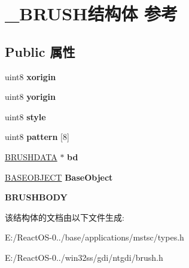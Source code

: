 \hypertarget{struct___b_r_u_s_h}{}\section{\+\_\+\+B\+R\+U\+S\+H结构体 参考}
\label{struct___b_r_u_s_h}
\subsection*{Public 属性}
\begin{DoxyCompactItemize}
\item 
\mbox{\label{struct___b_r_u_s_h_a29a28fcac88f1c9c8093e3fcf7a2870e}} 
uint8 {\bfseries xorigin}
\item 
\mbox{\label{struct___b_r_u_s_h_aa1ecd386bbd7ec30848c1099793a66e0}} 
uint8 {\bfseries yorigin}
\item 
\mbox{\label{struct___b_r_u_s_h_af7b4c24abf9bda140d6fb9d900e4987a}} 
uint8 {\bfseries style}
\item 
\mbox{\label{struct___b_r_u_s_h_a45c7c1935a1cee02b424eadb05a6f437}} 
uint8 {\bfseries pattern} \mbox{[}8\mbox{]}
\item 
\mbox{\label{struct___b_r_u_s_h_ae3bef8197baf92ec58d42bec24030731}} 
\hyperlink{struct___b_r_u_s_h_d_a_t_a}{B\+R\+U\+S\+H\+D\+A\+TA} $\ast$ {\bfseries bd}
\item 
\mbox{\label{struct___b_r_u_s_h_a16f3cb11d8dd300e6395d48e9dea2488}} 
\hyperlink{class_b_a_s_e_o_b_j_e_c_t}{B\+A\+S\+E\+O\+B\+J\+E\+CT} {\bfseries Base\+Object}
\item 
\mbox{\label{struct___b_r_u_s_h_aa7f370f49a3354ac92f53b4513d615b6}} 
{\bfseries B\+R\+U\+S\+H\+B\+O\+DY}
\end{DoxyCompactItemize}


该结构体的文档由以下文件生成\+:\begin{DoxyCompactItemize}
\item 
E\+:/\+React\+O\+S-\/0../base/applications/mstsc/types.\+h\item 
E\+:/\+React\+O\+S-\/0../win32ss/gdi/ntgdi/brush.\+h\end{DoxyCompactItemize}
